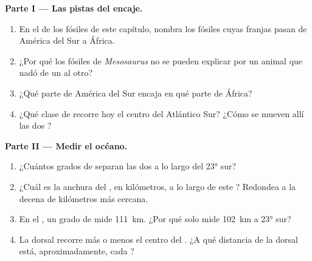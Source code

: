 \begin{problem}
\medskip
\noindent\textbf{Parte I --- Las pistas del encaje.}
\begin{enumerate}
  \item En el  de los fósiles de este capítulo, nombra los fósiles cuyas
        franjas pasan de América del Sur a África.
  \item ¿Por qué los fósiles de \emph{Mesosaurus} no se pueden explicar por
        un animal que nadó de un  al otro?
  \item ¿Qué parte de América del Sur encaja en qué parte de África?
  \item ¿Qué clase de  recorre hoy el centro del Atlántico
        Sur? ¿Cómo se mueven allí las dos ?
\end{enumerate}

\medskip
\noindent\textbf{Parte II --- Medir el océano.}
\begin{enumerate}[resume]
  \item ¿Cuántos grados de  separan las dos  a lo largo del
         \ang{23} sur?
  \item ¿Cuál es la anchura del , en kilómetros, a lo largo de este
        ? Redondea a la decena de kilómetros más cercana.
  \item En el , un grado de  mide \qty{111}{km}. ¿Por qué
        solo mide \qty{102}{km} a \ang{23} sur?
  \item La dorsal recorre más o menos el centro del . ¿A qué
        distancia de la dorsal está, aproximadamente, cada ?
\end{enumerate}


\end{problem}
